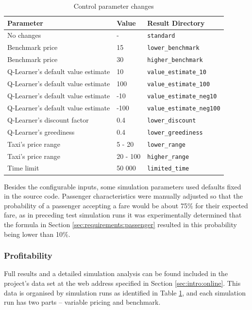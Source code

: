 \begin{table}
\begin{tabular}{ | l | l | l | }
  \hline
  Parameter & Value & Result Directory \\ \hline
  No changes & - & \texttt{standard} \\
  Benchmark price & 15 & \texttt{lower\_benchmark} \\
  Benchmark price & 30 & \texttt{higher\_benchmark} \\
  Q-Learner's default value estimate & 10 & \texttt{value\_estimate\_10} \\
  Q-Learner's default value estimate & 100 & \texttt{value\_estimate\_100} \\
  Q-Learner's default value estimate & -10 & \texttt{value\_estimate\_neg10} \\
  Q-Learner's default value estimate & -100 & \texttt{value\_estimate\_neg100} \\
  Q-Learner's discount factor & 0.4 & \texttt{lower\_discount} \\
  Q-Learner's greediness & 0.4 & \texttt{lower\_greediness} \\
  Taxi's price range & 5 - 20 & \texttt{lower\_range} \\
  Taxi's price range & 20 - 100 & \texttt{higher\_range} \\
  Time limit & 50 000 & \texttt{limited\_time} \\
  \hline
\end{tabular}
\caption{
  Control parameter changes
  \label{table:inputs:control}
}
\end{table}

Besides the configurable inputs, some simulation parameters used defaults
fixed in the source code. Passenger characteristics were manually adjusted so
that the probability of a passenger accepting a fare would be about 75\% for
their expected fare, as in preceding test simulation runs it was experimentally
determined that the formula in Section \ref{sec:requirements:passenger}
resulted in this probability being lower than 10\%.


\subsubsection{Profitability}
\label{sec:results:profits}

Full results and a detailed simulation analysis can be found included in the
project's data set at the web address specified in Section
\ref{sec:intro:online}. This data is organised by simulation runs as identified
in Table \ref{table:inputs:control}, and each simulation run has two parts -- variable
pricing and benchmark.

